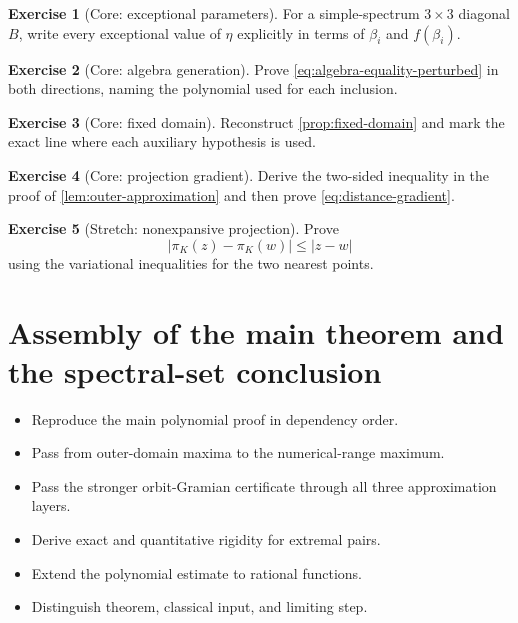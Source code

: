 \documentclass[11pt,oneside,openany]{book}
\theoremstyle{definition}
\newtheorem{exercise}{Exercise}[chapter]
\theoremstyle{remark}
\begin{document}
\begin{exercise}[Core: exceptional parameters]
\label{ex:exceptional-eta}
For a simple-spectrum \(3\times3\) diagonal \(B\), write every
exceptional value of \(\eta\) explicitly in terms of
\(\beta_i\) and \(f(\beta_i)\).
\end{exercise}

\begin{exercise}[Core: algebra generation]
Prove \eqref{eq:algebra-equality-perturbed} in both directions, naming
the polynomial used for each inclusion.
\end{exercise}

\begin{exercise}[Core: fixed domain]
Reconstruct \cref{prop:fixed-domain} and mark the exact line where
each auxiliary hypothesis is used.
\end{exercise}

\begin{exercise}[Core: projection gradient]
\label{ex:projection-gradient}
Derive the two-sided inequality in the proof of
\cref{lem:outer-approximation} and then prove
\eqref{eq:distance-gradient}.
\end{exercise}

\begin{exercise}[Stretch: nonexpansive projection]
Prove
\[
  |\pi_K(z)-\pi_K(w)|\leq|z-w|
\]
using the variational inequalities for the two nearest points.
\end{exercise}

\chapter{Assembly of the main theorem and the spectral-set conclusion}
\label{ch:main-assembly}

\begin{learninggoals}
\begin{itemize}
  \item Reproduce the main polynomial proof in dependency order.
  \item Pass from outer-domain maxima to the numerical-range maximum.
  \item Pass the stronger orbit-Gramian certificate through all three
  approximation layers.
  \item Derive exact and quantitative rigidity for extremal pairs.
  \item Extend the polynomial estimate to rational functions.
  \item Distinguish theorem, classical input, and limiting step.
\end{itemize}
\end{learninggoals}
\end{document}

